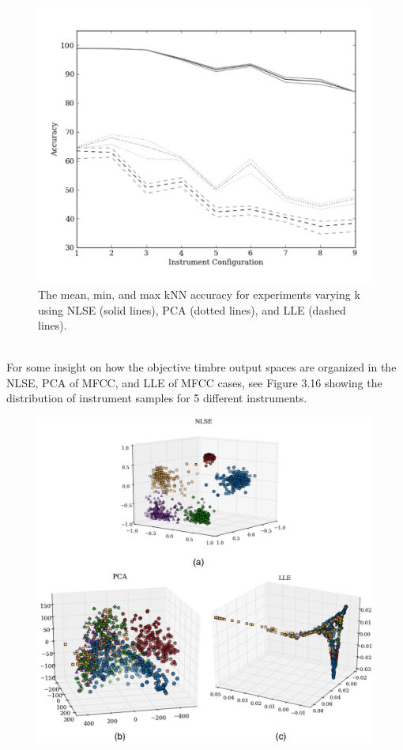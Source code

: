 \documentclass[a4paper,12pt]{report} 	%
\numberwithin{figure}{chapter}
\numberwithin{table}{chapter}
\numberwithin{equation}{chapter}
\begin{document}
\begin{flushleft}
\begin{figure}[h!]
\begin{center}
\includegraphics[scale=0.85]{CNN_kNN}
\caption[kNN accuracy for NLSE, PCA, and LLE]{The mean, min, and max kNN accuracy for experiments varying k using NLSE (solid lines), PCA (dotted lines), and LLE (dashed lines).}
\end{center}
\end{figure}
\\
For some insight on how the objective timbre output spaces are organized in the NLSE, PCA of MFCC, and LLE of MFCC cases, see Figure 3.16 showing the distribution of instrument samples for 5 different instruments.
\begin{figure}[h!]
\begin{center}
\includegraphics[width=\linewidth]{NLSECluster}

\end{center}
\end{figure}
\end{flushleft}
\end{document}
